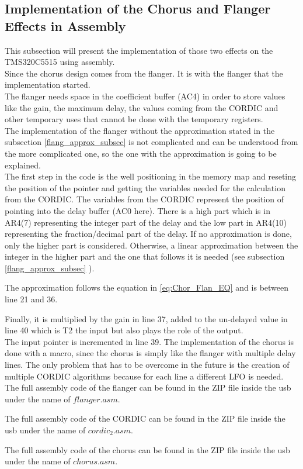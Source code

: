 \subsection{Implementation of the Chorus and Flanger Effects in Assembly}

This subsection will present the implementation of those two effects on the TMS320C5515 using assembly. \\
Since the chorus design comes from the flanger. It is with the flanger that the implementation started. \\
The flanger needs space in the coefficient buffer (AC4) in order to store values like the gain, the maximum delay, the values coming from the CORDIC and other temporary uses that cannot be done with the temporary registers. \\
The implementation of the flanger without the approximation stated in the subsection \ref{flang_approx_subsec} is not complicated and can be understood from the more complicated one, so the one with the approximation is going to be explained. \\
The first step in the code is the well positioning in the memory map and reseting the position of the pointer and getting the variables needed for the calculation from the CORDIC.
The variables from the CORDIC represent the position of pointing into the delay buffer (AC0 here). There is a high part which is in AR4(7) representing the integer part of the delay and the low part in AR4(10) representing the fraction/decimal part of the delay. If no approximation is done, only the higher part is considered. Otherwise, a linear approximation between the integer in the higher part and the one that follows it is needed (see subsection \ref{flang_approx_subsec} ). 

The approximation follows the equation in \ref{eq:Chor_Flan_EQ} and is between line 21 and 36. 


Finally, it is multiplied by the gain in line 37, added to the un-delayed value in line 40 which is T2 the input but also plays the role of the output. \\
The input pointer is incremented in line 39. 
The implementation of the chorus is done with a macro, since the chorus is simply like the flanger with multiple delay lines. The only problem that has to be overcome in the future is the creation of multiple CORDIC algorithms because for each line a different LFO is needed. \\

The full assembly code of the flanger can be found in the ZIP file inside the usb under the name of $flanger.asm$. 

The full assembly code of the CORDIC can be found in the ZIP file inside the usb under the name of $cordic_2.asm$. 

The full assembly code of the chorus can be found in the ZIP file inside the usb under the name of $chorus.asm$. 